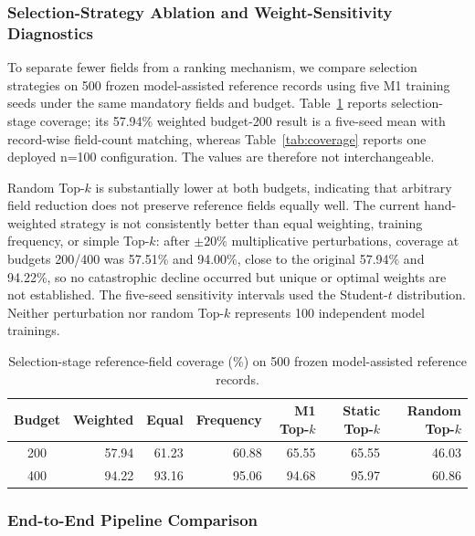 \documentclass[runningheads]{llncs}
\newcommand{\method}{M1}
\begin{document}
\subsubsection{Selection-Strategy Ablation and Weight-Sensitivity Diagnostics}

 To separate fewer fields from a ranking mechanism, we compare selection strategies on 500 frozen model-assisted reference records using five \method{} training seeds under the same mandatory fields and budget. Table~\ref{tab:selection-ablation} reports selection-stage coverage; its 57.94\% weighted budget-200 result is a five-seed mean with record-wise field-count matching, whereas Table~\ref{tab:coverage} reports one deployed n=100 configuration. The values are therefore not interchangeable.

 Random Top-$k$ is substantially lower at both budgets, indicating that arbitrary field reduction does not preserve reference fields equally well. The current hand-weighted strategy is not consistently better than equal weighting, training frequency, or simple Top-$k$: after $\pm20\%$ multiplicative perturbations, coverage at budgets 200/400 was 57.51\% and 94.00\%, close to the original 57.94\% and 94.22\%, so no catastrophic decline occurred but unique or optimal weights are not established. The five-seed sensitivity intervals used the Student-$t$ distribution. Neither perturbation nor random Top-$k$ represents 100 independent model trainings.

\begin{table}[htbp]\centering\scriptsize
\caption{Selection-stage reference-field coverage (\%) on 500 frozen model-assisted reference records.}\label{tab:selection-ablation}
\begin{tabular*}{\linewidth}{@{\extracolsep{\fill}}crrrrrr@{}}\toprule
Budget & Weighted & Equal & Frequency & \method{} Top-$k$ & Static Top-$k$ & Random Top-$k$\\\midrule
200 & 57.94 & 61.23 & 60.88 & 65.55 & 65.55 & 46.03\\
400 & 94.22 & 93.16 & 95.06 & 94.68 & 95.97 & 60.86\\\bottomrule
\end{tabular*}\end{table}

\subsubsection{End-to-End Pipeline Comparison}
\end{document}
